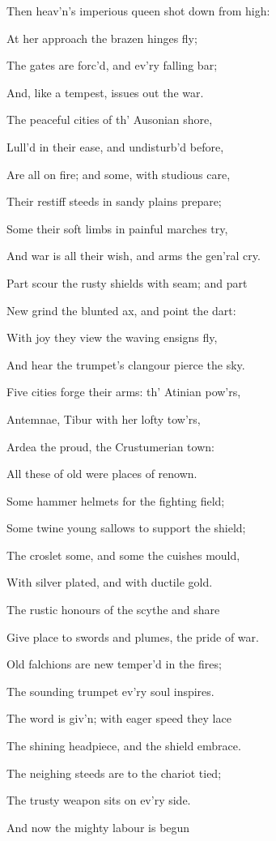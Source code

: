 Then heav’n’s imperious queen shot down from high:

At her approach the brazen hinges fly;

The gates are forc’d, and ev’ry falling bar;

And, like a tempest, issues out the war.

The peaceful cities of th’ Ausonian shore,

Lull’d in their ease, and undisturb’d before,

Are all on fire; and some, with studious care,

Their restiff steeds in sandy plains prepare;

Some their soft limbs in painful marches try,

And war is all their wish, and arms the gen’ral cry.

Part scour the rusty shields with seam; and part

New grind the blunted ax, and point the dart:

With joy they view the waving ensigns fly,

And hear the trumpet’s clangour pierce the sky.

Five cities forge their arms: th’ Atinian pow’rs,

Antemnae, Tibur with her lofty tow’rs,

Ardea the proud, the Crustumerian town:

All these of old were places of renown.

Some hammer helmets for the fighting field;

Some twine young sallows to support the shield;

The croslet some, and some the cuishes mould,

With silver plated, and with ductile gold.

The rustic honours of the scythe and share

Give place to swords and plumes, the pride of war.

Old falchions are new temper’d in the fires;

The sounding trumpet ev’ry soul inspires.

The word is giv’n; with eager speed they lace

The shining headpiece, and the shield embrace.

The neighing steeds are to the chariot tied;

The trusty weapon sits on ev’ry side.

And now the mighty labour is begun

